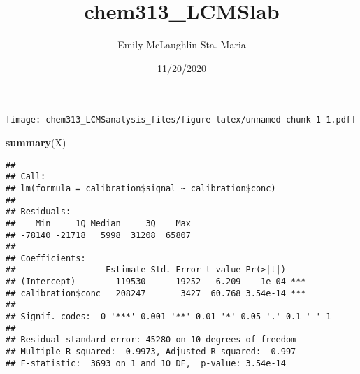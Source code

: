\documentclass[]{article}
\title{chem313\_LCMSlab}
\author{Emily McLaughlin Sta. Maria}
\date{11/20/2020}
\newenvironment{Shaded}{\begin{snugshade}}{\end{snugshade}}
\newcommand{\KeywordTok}[1]{\textcolor[rgb]{0.13,0.29,0.53}{\textbf{#1}}}
\newcommand{\DataTypeTok}[1]{\textcolor[rgb]{0.13,0.29,0.53}{#1}}
\newcommand{\StringTok}[1]{\textcolor[rgb]{0.31,0.60,0.02}{#1}}
\newcommand{\OperatorTok}[1]{\textcolor[rgb]{0.81,0.36,0.00}{\textbf{#1}}}
\newcommand{\NormalTok}[1]{#1}
\begin{document}
\maketitle

\begin{Shaded}
\end{Shaded}

\texttt{[image: chem313\_LCMSanalysis\_files/figure-latex/unnamed-chunk-1-1.pdf]}

\begin{Shaded}
\begin{Highlighting}[]
\KeywordTok{summary}\NormalTok{(X)}
\end{Highlighting}
\end{Shaded}

\begin{verbatim}
## 
## Call:
## lm(formula = calibration$signal ~ calibration$conc)
## 
## Residuals:
##    Min     1Q Median     3Q    Max 
## -78140 -21718   5998  31208  65807 
## 
## Coefficients:
##                  Estimate Std. Error t value Pr(>|t|)    
## (Intercept)       -119530      19252  -6.209    1e-04 ***
## calibration$conc   208247       3427  60.768 3.54e-14 ***
## ---
## Signif. codes:  0 '***' 0.001 '**' 0.01 '*' 0.05 '.' 0.1 ' ' 1
## 
## Residual standard error: 45280 on 10 degrees of freedom
## Multiple R-squared:  0.9973, Adjusted R-squared:  0.997 
## F-statistic:  3693 on 1 and 10 DF,  p-value: 3.54e-14
\end{verbatim}
\end{document}
